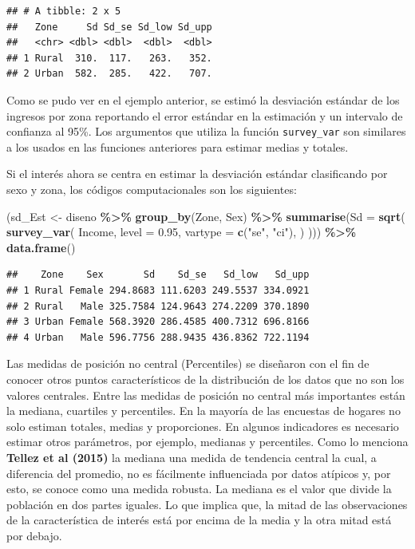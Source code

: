 \documentclass[
  12pt,
]{book}
\newenvironment{Shaded}{\begin{snugshade}}{\end{snugshade}}
\newcommand{\AttributeTok}[1]{\textcolor[rgb]{0.13,0.29,0.53}{#1}}
\newcommand{\FloatTok}[1]{\textcolor[rgb]{0.00,0.00,0.81}{#1}}
\newcommand{\FunctionTok}[1]{\textcolor[rgb]{0.13,0.29,0.53}{\textbf{#1}}}
\newcommand{\NormalTok}[1]{#1}
\newcommand{\OtherTok}[1]{\textcolor[rgb]{0.56,0.35,0.01}{#1}}
\newcommand{\SpecialCharTok}[1]{\textcolor[rgb]{0.81,0.36,0.00}{\textbf{#1}}}
\newcommand{\StringTok}[1]{\textcolor[rgb]{0.31,0.60,0.02}{#1}}
\begin{document}
\begin{verbatim}
## # A tibble: 2 x 5
##   Zone     Sd Sd_se Sd_low Sd_upp
##   <chr> <dbl> <dbl>  <dbl>  <dbl>
## 1 Rural  310.  117.   263.   352.
## 2 Urban  582.  285.   422.   707.
\end{verbatim}

Como se pudo ver en el ejemplo anterior, se estimó la desviación estándar de los ingresos por zona reportando el error estándar en la estimación y un intervalo de confianza al 95\%. Los argumentos que utiliza la función \texttt{survey\_var} son similares a los usados en las funciones anteriores para estimar medias y totales.

Si el interés ahora se centra en estimar la desviación estándar clasificando por sexo y zona, los códigos computacionales son los siguientes:

\begin{Shaded}
\begin{Highlighting}[]
\NormalTok{(sd\_Est }\OtherTok{\textless{}{-}}\NormalTok{ diseno }\SpecialCharTok{\%\textgreater{}\%} \FunctionTok{group\_by}\NormalTok{(Zone, Sex) }\SpecialCharTok{\%\textgreater{}\%}
   \FunctionTok{summarise}\NormalTok{(}\AttributeTok{Sd =} \FunctionTok{sqrt}\NormalTok{(}
  \FunctionTok{survey\_var}\NormalTok{(}
\NormalTok{    Income,}
    \AttributeTok{level =} \FloatTok{0.95}\NormalTok{,}
    \AttributeTok{vartype =}  \FunctionTok{c}\NormalTok{(}\StringTok{"se"}\NormalTok{, }\StringTok{"ci"}\NormalTok{),}
\NormalTok{   )}
\NormalTok{))) }\SpecialCharTok{\%\textgreater{}\%} \FunctionTok{data.frame}\NormalTok{()}
\end{Highlighting}
\end{Shaded}

\begin{verbatim}
##    Zone    Sex       Sd    Sd_se   Sd_low   Sd_upp
## 1 Rural Female 294.8683 111.6203 249.5537 334.0921
## 2 Rural   Male 325.7584 124.9643 274.2209 370.1890
## 3 Urban Female 568.3920 286.4585 400.7312 696.8166
## 4 Urban   Male 596.7756 288.9435 436.8362 722.1194
\end{verbatim}

Las medidas de posición no central (Percentiles) se diseñaron con el fin de conocer otros puntos característicos de la distribución de los datos que no son los valores centrales. Entre las medidas de posición no central más importantes están la mediana, cuartiles y percentiles. En la mayoría de las encuestas de hogares no solo estiman totales, medias y proporciones. En algunos indicadores es necesario estimar otros parámetros, por ejemplo, medianas y percentiles. Como lo menciona \textbf{Tellez et al (2015)} la mediana una medida de tendencia central la cual, a diferencia del promedio, no es fácilmente influenciada por datos atípicos y, por esto, se conoce como una medida robusta. La mediana es el valor que divide la población en dos partes iguales. Lo que implica que, la mitad de las observaciones de la característica de interés está por encima de la media y la otra mitad está por debajo.
\end{document}
